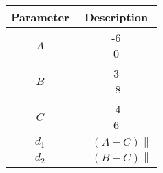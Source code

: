 \begin{tabular}{|c|c|}
        \hline
        Parameter & Description\\
        \hline
        $A$ & \myvec{-6\\0}\\
        \hline
        $B$ & \myvec{3\\-8}\\
        \hline
        $C$ & \myvec{-4\\6}\\
        \hline
        $d_1$ & \(\left\|{(A-C)}\right\|\)\\
        \hline
        $d_2$ & \(\left\|{(B-C)}\right\|\)\\
        \hline
\end{tabular}

